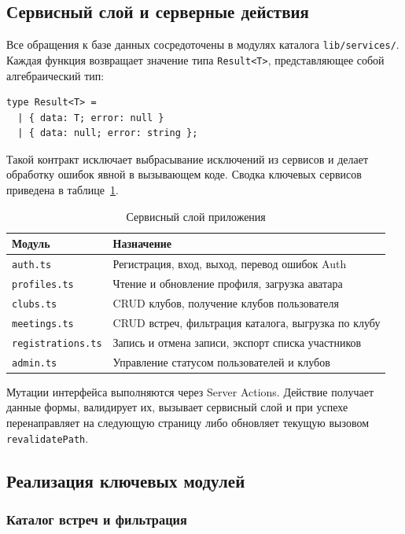 \subsection{Сервисный слой и серверные действия}

Все обращения к базе данных сосредоточены в модулях каталога
\texttt{lib/services/}. Каждая функция возвращает значение типа
\texttt{Result<T>}, представляющее собой алгебраический тип:

\begin{verbatim}
type Result<T> =
  | { data: T; error: null }
  | { data: null; error: string };
\end{verbatim}

Такой контракт исключает выбрасывание исключений из сервисов и
делает обработку ошибок явной в вызывающем коде. Сводка ключевых
сервисов приведена в таблице~\ref{tab:services}.

\begin{table}[h]
\centering
\caption{Сервисный слой приложения}
\label{tab:services}
\begin{tabular}{|p{4cm}|p{10cm}|}
\hline
\textbf{Модуль} & \textbf{Назначение} \\
\hline
\texttt{auth.ts} & Регистрация, вход, выход, перевод ошибок Auth \\
\hline
\texttt{profiles.ts} & Чтение и обновление профиля, загрузка аватара \\
\hline
\texttt{clubs.ts} & CRUD клубов, получение клубов пользователя \\
\hline
\texttt{meetings.ts} & CRUD встреч, фильтрация каталога, выгрузка по клубу \\
\hline
\texttt{registrations.ts} & Запись и отмена записи, экспорт списка участников \\
\hline
\texttt{admin.ts} & Управление статусом пользователей и клубов \\
\hline
\end{tabular}
\end{table}

Мутации интерфейса выполняются через Server Actions. Действие
получает данные формы, валидирует их, вызывает сервисный слой
и при успехе перенаправляет на следующую страницу либо
обновляет текущую вызовом \texttt{revalidatePath}.

\subsection{Реализация ключевых модулей}

\subsubsection{Каталог встреч и фильтрация}

